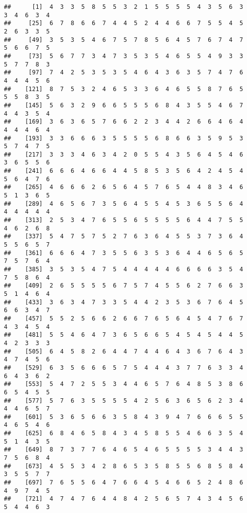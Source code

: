 \documentclass[
]{book}
\begin{document}
\begin{verbatim}
##      [1]  4  3  3  5  8  5  5  3  2  1  5  5  5  5  4  3  5  6  3  3  4  6  3  4
##     [25]  6  7  8  6  6  7  4  4  5  2  4  4  6  6  7  5  5  4  5  2  6  3  3  5
##     [49]  3  5  3  5  4  6  7  5  7  8  5  6  4  5  7  6  7  4  7  5  6  6  7  5
##     [73]  5  6  7  7  3  4  7  3  5  3  5  4  6  5  5  4  9  3  3  5  7  7  8  3
##     [97]  7  4  2  5  3  5  3  5  4  6  4  3  6  3  5  7  4  7  6  4  4  4  5  6
##    [121]  8  7  5  3  2  4  6  5  3  3  6  4  6  5  5  8  7  6  5  5  5  8  3  5
##    [145]  5  6  3  2  9  6  6  5  5  5  6  8  4  3  5  5  4  6  7  4  4  3  5  4
##    [169]  3  6  3  6  5  7  6  6  2  2  3  4  4  2  6  6  4  6  4  4  4  4  6  4
##    [193]  3  3  6  6  6  3  5  5  5  5  6  8  6  6  3  5  9  5  3  5  7  4  7  5
##    [217]  3  3  3  4  6  3  4  2  0  5  5  4  3  5  6  4  5  4  6  3  6  5  5  6
##    [241]  6  6  6  4  6  6  4  4  5  8  5  3  5  6  4  2  4  5  4  5  6  4  7  6
##    [265]  4  6  6  6  2  6  5  6  4  5  7  6  5  4  4  8  3  4  6  5  1  3  6  5
##    [289]  4  6  5  6  7  3  5  6  4  5  5  4  5  3  6  5  5  6  4  4  4  4  4  4
##    [313]  2  5  3  4  7  6  5  5  6  5  5  5  5  6  4  4  7  5  5  4  6  2  6  8
##    [337]  5  4  7  5  7  5  2  7  6  3  6  4  5  5  3  7  3  6  4  5  5  6  5  7
##    [361]  6  6  6  4  7  3  5  5  6  3  5  3  6  4  4  6  5  6  5  7  5  7  6  4
##    [385]  3  5  3  5  4  7  5  4  4  4  4  4  6  6  6  6  3  5  4  7  5  8  6  4
##    [409]  2  6  5  5  5  5  6  7  5  7  4  5  5  6  2  7  6  6  3  5  1  4  6  4
##    [433]  3  6  3  4  7  3  3  5  4  4  2  3  5  3  6  7  6  4  5  6  6  3  4  7
##    [457]  5  5  2  5  6  6  2  6  6  7  6  5  6  4  5  4  7  6  7  4  3  4  5  4
##    [481]  5  5  4  6  4  7  3  6  5  6  6  5  4  5  4  5  4  4  5  4  2  3  3  3
##    [505]  6  4  5  8  2  6  4  4  7  4  4  6  4  3  6  7  6  4  3  4  7  4  5  6
##    [529]  6  3  5  6  6  6  5  7  5  4  4  4  3  7  7  6  3  3  4  6  4  3  6  2
##    [553]  5  4  7  2  5  5  3  4  4  6  5  7  6  4  8  5  3  8  6  6  5  4  5  5
##    [577]  5  7  6  3  5  5  5  5  4  2  5  6  3  6  5  6  2  3  4  4  4  6  5  7
##    [601]  5  3  6  5  6  6  3  5  8  4  3  9  4  7  6  6  6  5  5  4  6  5  4  6
##    [625]  6  8  4  6  5  8  4  3  4  5  8  5  5  4  6  6  3  5  4  5  1  4  3  5
##    [649]  8  7  3  7  7  6  4  6  5  4  6  5  5  5  5  3  4  4  3  7  5  6  8  4
##    [673]  4  5  5  3  4  2  8  6  5  3  5  8  5  5  6  8  5  8  4  3  5  5  7  7
##    [697]  7  6  5  5  6  4  7  6  6  4  5  4  6  6  5  2  4  8  6  4  9  7  4  5
##    [721]  4  7  4  7  6  4  4  8  4  2  5  6  5  7  4  3  4  5  6  5  4  4  6  3

\end{verbatim}
\end{document}
